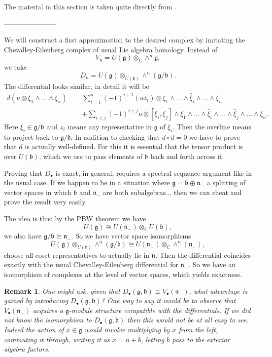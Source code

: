 \documentclass[12pt]{article}
\theoremstyle{plain}
\newtheorem{rem}[thm]{Remark}
\theoremstyle{definition}
\numberwithin{equation}{section}
\newcommand{\what}[1]{\widehat{#1}}
\newcommand{\ov}[1]{\overline#1}
\newcommand{\C}{\mathbb{C}}
\newcommand{\g}{\mathfrak{g}}
\newcommand{\n}{\mathfrak{n}}
\newcommand{\fb}{\mathfrak{b}}
\begin{document}
The material in this section is taken quite directly from {\cite[Sections 6.1-6.4]{humbgg}}.

-----------------------


We will construct a first approximation to the desired complex by imitating the Chevalley-Eilenberg complex of usual Lie algebra homology. Instead of
\[
V_n = U(\g) \otimes_{\C} \wedge^n \g,
\]
we take
\[
D_n = U(\g) \otimes_{U(\fb)} \wedge^n(\g/\fb).
\]
The differential looks similar, in detail it will be
\begin{align*}
d(u \otimes \xi_1 \wedge \ldots \wedge \xi_n) = {} & \sum_{i=1}^{n} (-1)^{i+1} (u z_i) \otimes \xi_1 \wedge \ldots \wedge \what\xi_i \wedge \ldots \wedge \xi_n \\
&+ \sum_{i < j} (-1)^{i+j} u \otimes \ov{{[\xi_i, \xi_j]}} \wedge \xi_1 \wedge \ldots \wedge \what\xi_i \wedge \ldots \wedge \what\xi_j \wedge \ldots \wedge \xi_n.
\end{align*}
Here $\xi_i \in \g/\fb$ and $z_i$ means any representative in $\g$ of $\xi_i$. Then the overline means to project back to $\g/\fb$. In addition to checking that $d \circ d = 0$ we have to prove that $d$ is actually well-defined. For this it is essential that the tensor product is over $U(\fb)$, which we use to pass elements of $\fb$ back and forth across it.

Proving that $D_\bullet$ is exact, in general, requires a spectral sequence argument like in the usual case. If we happen to be in a situation where $\g = \fb \oplus \n_-$ a splitting of vector spaces in which $\fb$ and $\n_-$ are both subalgebras... then we can cheat and prove the result very easily.

The idea is this: by the PBW theorem we have
\[
U(\g) \cong U(\n_-) \otimes_\C U(\fb),
\]
we also have $\g / \fb \cong \n_-$. So we have vector space isomorphisms
\[
U(\g) \otimes_{U(\fb)} \wedge^n(\g/\fb) \cong U(\n_-) \otimes_\C \wedge^n(\n_-),
\]
choose all coset representatives to actually lie in $\n$. Then the differential coincides exactly with the usual Chevalley-Eilenberg differential for $\n_-$. So we have an isomorphism of complexes at the level of vector spaces, which yields exactness.



\begin{rem}
One might ask, given that $D_\bullet(\g, \fb) \cong V_\bullet(\n_-)$, what advantage is gained by introducing $D_\bullet(\g, \fb)$? One way to say it would be to observe that $V_\bullet(\n_-)$ acquires a $\g$-module structure compatible with the differentials. If we did not know the isomorphism to $D_\bullet(\g, \fb)$ then this would not be at all easy to see. Indeed the action of $x \in \g$ would involve multiplying by $x$ from the left, commuting it through, writing it as $x=n+b$, letting $b$ pass to the exterior algebra factors.
\end{rem}
\end{document}
